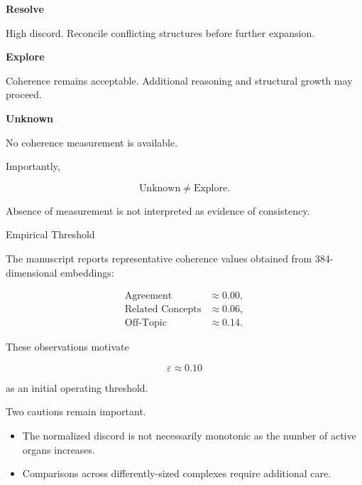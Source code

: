 
\begin{highlightbox}


\BodyFont

\textbf{Resolve}

High discord.
Reconcile conflicting structures before further expansion.

\vspace{2mm}

\textbf{Explore}

Coherence remains acceptable.
Additional reasoning and structural growth may proceed.

\vspace{2mm}

\textbf{Unknown}

No coherence measurement is available.

Importantly,

\[
\boxed{
\text{Unknown}
\neq
\text{Explore}.
}
\]

Absence of measurement is not interpreted as evidence of consistency.

\end{highlightbox}


\begin{mosbox}{Empirical Threshold}

\BodyFont

The manuscript reports representative coherence values obtained from
384-dimensional embeddings:

\[
\begin{aligned}
\text{Agreement}
&\approx
0.00,
\\[2mm]
\text{Related Concepts}
&\approx
0.06,
\\[2mm]
\text{Off-Topic}
&\approx
0.14.
\end{aligned}
\]

These observations motivate

\[
\boxed{
\varepsilon\approx0.10
}
\]

as an initial operating threshold.

Two cautions remain important.

\begin{itemize}

\item
The normalized discord is not necessarily monotonic as the number of
active organs increases.

\item
Comparisons across differently-sized complexes require additional care.

\end{itemize}

\end{mosbox}

